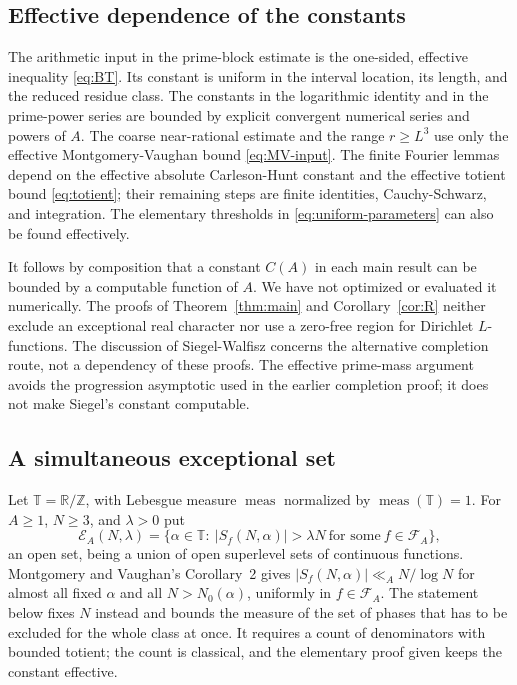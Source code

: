 \documentclass[11pt]{amsart}
\numberwithin{equation}{section}
\numberwithin{figure}{section}
\theoremstyle{definition}
\newcommand{\Z}{\mathbb{Z}}
\newcommand{\R}{\mathbb{R}}
\newcommand{\FA}{\mathcal F_A}
\begin{document}
\subsection{Effective dependence of the constants}\label{sec:effectivity}

The arithmetic input in the prime-block estimate is the one-sided,
effective inequality \eqref{eq:BT}. Its constant is uniform in the
interval location, its length, and the reduced residue class.
The constants in the logarithmic identity and in the prime-power
series are bounded by explicit convergent numerical series and powers
of $A$. The coarse near-rational estimate and the range $r\ge L^3$
use only the effective Montgomery-Vaughan bound
\eqref{eq:MV-input}. The finite Fourier lemmas depend on the effective
absolute Carleson-Hunt constant and the effective totient bound
\eqref{eq:totient}; their remaining steps are finite identities,
Cauchy-Schwarz, and integration. The elementary thresholds in
\eqref{eq:uniform-parameters} can also be found effectively.

It follows by composition that a constant $C(A)$ in each main result
can be bounded by a computable function of $A$. We have not optimized
or evaluated it numerically. The proofs of Theorem~\ref{thm:main}
and Corollary~\ref{cor:R} neither exclude an exceptional real
character nor use a zero-free region for Dirichlet $L$-functions.
The discussion of Siegel-Walfisz concerns the alternative completion
route, not a dependency of these proofs. The effective prime-mass
argument avoids the progression asymptotic used in the earlier
completion proof; it does not make Siegel's constant computable.

\subsection{A simultaneous exceptional set}\label{sec:exceptional}

Let $\mathbb T=\R/\Z$, with Lebesgue measure $\operatorname{meas}$
normalized by $\operatorname{meas}(\mathbb T)=1$. For $A\ge1$,
$N\ge3$, and $\lambda>0$ put
\begin{equation}\label{eq:exceptional-definition}
 \mathcal E_A(N,\lambda)
 =\{\alpha\in\mathbb T:\ |S_f(N,\alpha)|>\lambda N\ \text{for some}\ f\in\FA\},
\end{equation}
an open set, being a union of open superlevel sets of continuous
functions. Montgomery and Vaughan's Corollary~2 \cite{MV} gives
$|S_f(N,\alpha)|\ll_AN/\log N$ for almost all fixed $\alpha$ and all
$N>N_0(\alpha)$, uniformly in $f\in\FA$. The statement below fixes $N$
instead and bounds the measure of the set of phases that has to be
excluded for the whole class at once. It requires a count of
denominators with bounded totient; the count is classical, and the
elementary proof given keeps the constant effective.
\end{document}

